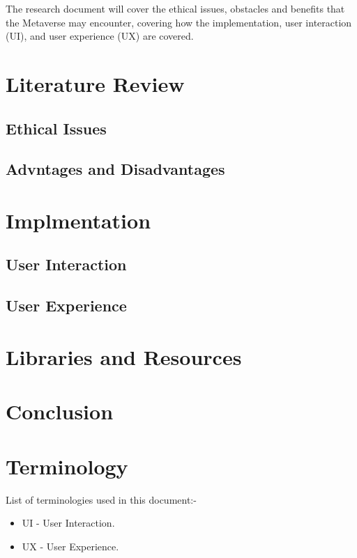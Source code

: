 \documentclass[conference]{IEEEtran}
\begin{document}
      The research document will cover the ethical issues, obstacles and benefits that the Metaverse may encounter, covering how the implementation, user interaction (UI), and user experience (UX) are covered.
    \section{Literature Review}
      \subsection{Ethical Issues}

      \subsection{Advntages and Disadvantages}

    \section{Implmentation}
      \subsection{User Interaction}
      \subsection{User Experience}
      
    \section{Libraries and Resources}

    \section{Conclusion}

    \section{Terminology}
      List of terminologies used in this document:-
      \begin{itemize}
        \item UI - User Interaction.
        \item UX - User Experience.
      \end{itemize}

  \nocite{*}
	\renewcommand\refname{\section{Reference List}}
	\small{
    }
\end{document}

